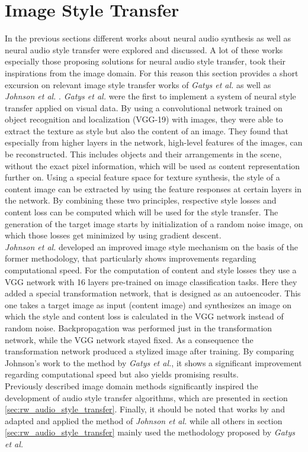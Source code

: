 \newpage
\section{Image Style Transfer}
\label{sec:rw_imgstyletransfer}
In the previous sections different works about neural audio synthesis as well as neural audio style transfer were explored and discussed. A lot of these works especially those proposing solutions for neural audio style transfer, took their inspirations from the image domain. For this reason this section provides a short excursion on relevant image style transfer works of \textit{Gatys et al.} as well as \textit{Johnson et al.} \cite{Gatys2016, johnson2016perceptual}. \textit{Gatys et al.} were the first to implement a system of neural style transfer applied on visual data. By using a convolutional network trained on object recognition and localization (VGG-19) with images, they were able to extract the texture as style but also the content of an image. They found that especially from higher layers in the network, high-level features of the images, can be reconstructed. This includes objects and their arrangements in the scene, without the exact pixel information, which will be used as content representation further on. Using a special feature space for texture synthesis, the style of a content image can be extracted by using the feature responses at certain layers in the network. By combining these two principles, respective style losses and content loss can be computed which will be used for the style transfer. The generation of the target image starts by initialization of a random noise image, on which those losses get minimized by using gradient descent.\\
\textit{Johnson et al.} developed an improved image style mechanism on the basis of the former methodology, that particularly shows improvements regarding computational speed. For the computation of content and style losses they use a VGG network with 16 layers pre-trained on image classification tasks. Here they added a special transformation network, that is designed as an autoencoder. This one takes a target image as input (content image) and synthesizes an image on which the style and content loss is calculated in the VGG network instead of random noise. Backpropagation was performed just in the transformation network, while the VGG network stayed fixed. As a consequence the transformation network produced a stylized image after training. By comparing Johnson's work to the method by \textit{Gatys et al.}, it shows a significant improvement regarding computational speed but also yields promising results.\\
Previously described image domain methods significantly inspired the development of audio style transfer algorithms, which are presented in section \ref{sec:rw_audio_style_transfer}. Finally, it should be noted that works by \cite{Ramani2018} and \cite{Liu2019} adapted and applied the method of \textit{Johnson et al.} while all others in section \ref{sec:rw_audio_style_transfer} mainly used the methodology proposed by \textit{Gatys et al.}